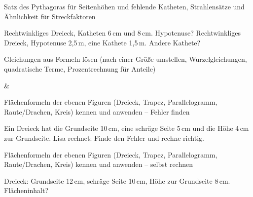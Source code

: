 \begin{aufgabe}{Satz des Pythagoras für Seitenhöhen und fehlende Katheten, Strahlensätze und Ähnlichkeit für Streckfaktoren}
\begin{teile}
\teil Rechtwinkliges Dreieck, Katheten 6\,cm und 8\,cm. Hypotenuse? \leerfeld[cm]
\teil Rechtwinkliges Dreieck, Hypotenuse 2{,}5\,m, eine Kathete 1{,}5\,m. Andere Kathete? \leerfeld[m]
\end{teile}
\end{aufgabe}

\begin{aufgabe}{Gleichungen aus Formeln lösen (nach einer Größe umstellen, Wurzelgleichungen, quadratische Terme, Prozentrechnung für Anteile)}
\begin{gleichungsraster}[2]
 &
 \\
\end{gleichungsraster}
\end{aufgabe}

\begin{aufgabe}{Flächenformeln der ebenen Figuren (Dreieck, Trapez, Parallelogramm, Raute/Drachen, Kreis) kennen und anwenden – Fehler finden}
\begin{teile}
\teil Ein Dreieck hat die Grundseite 10\,cm, eine schräge Seite 5\,cm und die Höhe 4\,cm zur Grundseite. Lisa rechnet:  Finde den Fehler und rechne richtig.
\end{teile}
\end{aufgabe}

\begin{aufgabe}{Flächenformeln der ebenen Figuren (Dreieck, Trapez, Parallelogramm, Raute/Drachen, Kreis) kennen und anwenden – selbst rechnen}
\begin{teile}
\teil Dreieck: Grundseite 12\,cm, schräge Seite 10\,cm, Höhe zur Grundseite 8\,cm. Flächeninhalt? \leerfeld[cm²]
\end{teile}
\end{aufgabe}
